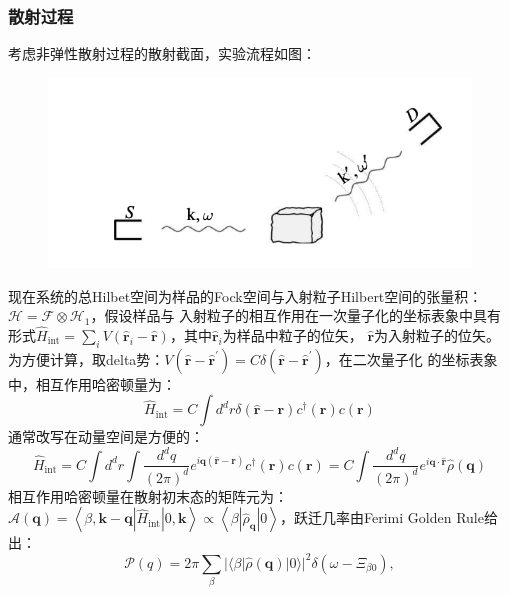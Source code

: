 \documentclass[10pt,openany]{book}
\theoremstyle{thmstyle} %
\theoremstyle{defstyle} %
\theoremstyle{prostyle} %
\begin{document}
\subsubsection{散射过程}
考虑非弹性散射过程的散射截面，实验流程如图：
\begin{figure}[htbp]
  \centering
  \includegraphics*[scale=1]{EXPS.png}
\end{figure}
现在系统的总Hilbet空间为样品的Fock空间与入射粒子Hilbert空间的张量积：$ \mathcal{H}=\mathcal{F} \otimes \mathcal{H}_1 $，假设样品与
入射粒子的相互作用在一次量子化的坐标表象中具有形式$ \hat{H}_{\mathrm{int}}=\sum_i V\left(\hat{\mathbf{r}}_i-\hat{\mathbf{r}}\right) $，其中$ \hat{\mathbf{r}}_i $为样品中粒子的位矢，
$ \hat{\mathbf{r}} $为入射粒子的位矢。为方便计算，取delta势：$ V\left(\hat{\mathbf{r}}-\hat{\mathbf{r}}^{\prime}\right)=C \delta\left(\hat{\mathbf{r}}-\hat{\mathbf{r}}^{\prime}\right) $，在二次量子化
的坐标表象中，相互作用哈密顿量为：
\begin{equation}
  \hat{H}_{\mathrm{int}}=C \int d^d r \delta(\hat{\mathbf{r}}-\mathbf{r}) c^{\dagger}(\mathbf{r}) c(\mathbf{r})
\end{equation}    
通常改写在动量空间是方便的：
\begin{equation}
  \hat{H}_{\mathrm{int}}=C \int d^d r \int \frac{d^d q}{(2 \pi)^d} e^{i \mathbf{q}(\hat{\mathbf{r}}-\mathbf{r})} c^{\dagger}(\mathbf{r}) c(\mathbf{r})=C \int \frac{d^d q}{(2 \pi)^d} e^{i \mathbf{q} \cdot \hat{\mathbf{r}}} \hat{\rho}(\mathbf{q})
\end{equation}
相互作用哈密顿量在散射初末态的矩阵元为：$ \mathcal{A}(\mathbf{q})=\left\langle\beta, \mathbf{k}-\mathbf{q}\left|\hat{H}_{\mathrm{int}}\right| 0, \mathbf{k}\right\rangle \propto\left\langle\beta\left|\hat{\rho}_{\mathbf{q}}\right| 0\right\rangle $，跃迁几率由Ferimi Golden Rule给出：
\begin{equation}
  \mathcal{P}(q)=2 \pi \sum_\beta|\langle\beta|\hat{\rho}(\mathbf{q})| 0\rangle|^2 \delta\left(\omega-\Xi_{\beta 0}\right),
  \label{FGR}
\end{equation} 
\end{document}

